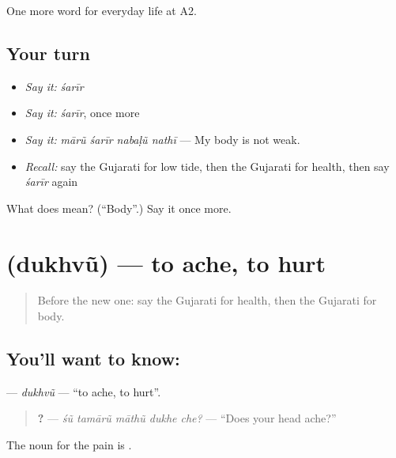 \begin{grammarlens}[title={What you've built}]
One more word for everyday life at A2.
\end{grammarlens}

\subsection*{Your turn}
\begin{itemize}
\raggedright
  \item \emph{Say it:} \emph{śarīr}
  \item \emph{Say it:} \emph{śarīr}, once more
  \item \emph{Say it:} \emph{mārũ śarīr nabaḷũ nathī} — My body is not weak.
  \item \emph{Recall:} say the Gujarati for low tide, then the Gujarati for health, then say \emph{śarīr} again
\end{itemize}

\begin{tcolorbox}[breakable,colback=teal!4,colframe=teal!35!black,title={Before you move on}]
What does  mean? (\textquotedblleft{}Body\textquotedblright{}.) Say it once more.
\end{tcolorbox}
\section[\texorpdfstring{\gu{દુખવું} (dukhvũ)}{દુખવું (dukhvũ)}]{ (dukhvũ) — to ache, to hurt}

\label{lesson:GU-C223-dukhvu}



\begin{quote}
Before the new one: say the Gujarati for health, then the Gujarati for body.
\end{quote}

\subsection*{You'll want to know: }
\textbf{} — \emph{dukhvũ} — \textquotedblleft{}to ache, to hurt\textquotedblright{}.

\begin{quote}
\textbf{    ?} — \emph{śũ tamārũ māthũ dukhe che?} — \textquotedblleft{}Does your head ache?\textquotedblright{}
\end{quote}

The noun for the pain is \textbf{}.

